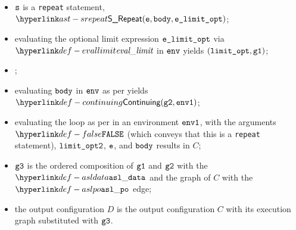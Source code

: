 \AllApply
\begin{itemize}
  \item $\vs$ is a \texttt{repeat} statement, $\SRepeat(\ve, \vbody, \velimitopt)$;
  \item evaluating the optional limit expression $\velimitopt$ via $\evallimit$ in $\env$
        yields $(\vlimitopt, \vgone)$\ProseOrError;
  \item \Proseticklooplimit{$\vlimitoptone$}{$\vlimitopttwo$}\ProseOrError;
  \item evaluating $\vbody$ in $\env$ as per 
        yields $\Continuing(\vgtwo, \envone)$\ProseTerminateAs{\ReturningConfig,\ThrowingConfig,\DynErrorConfig};
  \item evaluating the loop as per  in an environment $\envone$,
        with the arguments $\False$ (which conveys that this is a \texttt{repeat} statement),
        $\vlimitopttwo$,
        $\ve$,
        and $\vbody$
        results in $C$;
  \item $\vgthree$ is the ordered composition of $\vgone$ and $\vgtwo$ with the $\asldata$ and the graph of $C$
        with the $\aslpo$ edge;
  \item the output configuration $D$ is the output configuration $C$ with its execution graph
        substituted with $\vgthree$.
\end{itemize}
\FormallyParagraph
\begin{mathpar}
\end{mathpar}

\hypertarget{def-forstatementterm}{}
